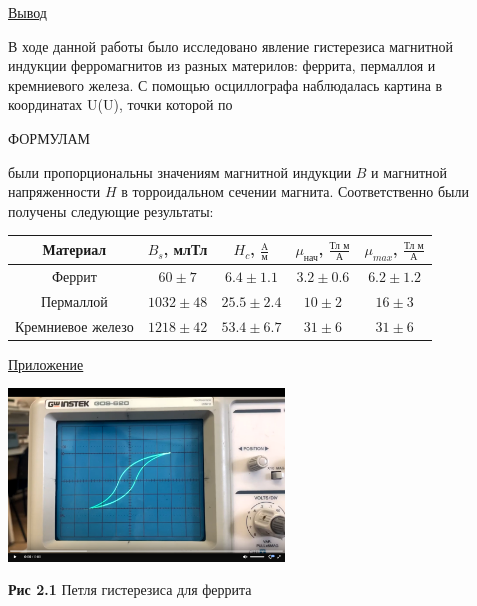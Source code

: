 \documentclass{article}
\begin{document}
\newpage

\begin{center}
    \raggedleft
        \underline{\underline{\LARGE {Вывод}}}
\end{center}

В ходе данной работы было исследовано явление гистерезиса магнитной индукции ферромагнитов из разных материлов: феррита, пермаллоя и кремниевого железа. С помощью осциллографа наблюдалась картина в координатах U(U), точки которой по 

\begin{center}
    ФОРМУЛАМ
\end{center}

были пропорциональны значениям магнитной индукции \(B\) и магнитной напряженности  \(H\) в торроидальном сечении магнита. Соответственно были получены следующие результаты:

\begin{center}
    \begin{tabular}{|c|c|c|c|c|}
        \hline
        Материал & \(B_{s}\), млТл & \(H_{c}\), \(\frac{\text{A}}{\text{м}}\) & \(\mu_{\text{нач}}\), \(\frac{\text{Тл м}}{\text{А}}\) & \(\mu_{max}\), \(\frac{\text{Тл м}}{\text{А}}\) \\ 
        \hline
        Феррит & \(60 \pm 7\) & \(6.4 \pm 1.1\) & \(3.2 \pm 0.6\) & \(6.2 \pm 1.2\) \\
        Пермаллой & \(1032 \pm 48\) & \(25.5 \pm 2.4\) & \(10 \pm 2\) & \(16 \pm 3\) \\
        Кремниевое железо & \(1218 \pm 42\) & \(53.4 \pm 6.7\) & \(31 \pm 6\) & \(31 \pm 6\) \\
        \hline
    \end{tabular}
\end{center}

\newpage

\begin{center}
    \raggedleft
        \underline{\underline{\LARGE {Приложение}}}
\end{center}

\begin{center}
    \includegraphics[width=0.55\textwidth]{ferrrit_p.png}
    
    \textbf{Рис 2.1} Петля гистерезиса для феррита
\end{center}
\end{document}
